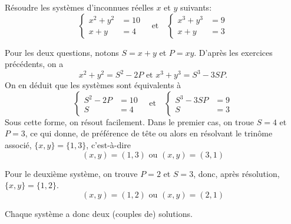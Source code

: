 \begin{exo}
Résoudre les systèmes d'inconnues réelles $x$ et $y$ suivants:
\[
\begin{cases}
x^2+y^2&=10\\
x+y&=4
\end{cases}
\quad\text{et} \quad
\begin{cases}
x^3+y^3&=9\\
x+y&=3
\end{cases}
\]
\begin{sol}
Pour les deux questions, notons $S=x+y$ et $P=xy$. D'après les exercices précédents, on a 
\[x^2+y^2=S^2-2P \text{ et } x^3+y^3 = S^3-3SP. \]
On en déduit que les systèmes sont équivalents à 
\[
\begin{cases}
S^2-2P&=10\\
S&=4
\end{cases}
\quad\text{et}\quad
\begin{cases}
S^3-3SP&=9\\
S&=3
\end{cases}
\]
Sous cette forme, on résout facilement. Dans le premier cas, on troue $S=4$ et $P=3$, ce qui donne, de préférence de tête ou alors en résolvant le trinôme associé, $\{x,y\} = \{1,3\}$, c'est-à-dire 
\[ (x,y)=(1,3) \text{ ou } (x,y)=(3,1)\]

Pour le deuxième système, on trouve $P=2$ et $S=3$, donc, après résolution, $\{x,y\}=\{1,2\}$.
\[ (x,y)=(1,2) \text{ ou } (x,y)=(2,1)\]

Chaque système a donc deux (couples de) solutions.
\end{sol}
\end{exo}


